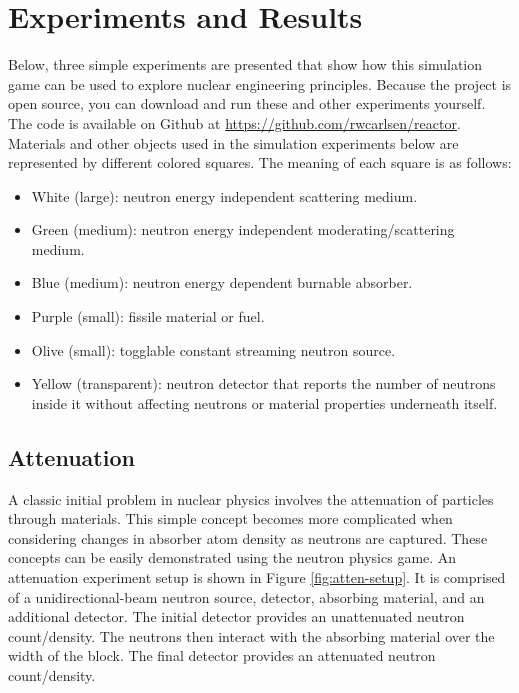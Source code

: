 \documentclass{anstrans}
\begin{document}
\section{Experiments and Results}

Below, three simple experiments are presented that show how this simulation
game can be used to explore nuclear engineering principles.  Because the
project is open source, you can download and run these and other
experiments yourself.  The code is available on Github at
\url{https://github.com/rwcarlsen/reactor}.  Materials and other objects used
in the simulation experiments below are represented by different colored
squares.  The meaning of each square is as follows:

\begin{itemize}
        
    \item White (large): neutron energy independent scattering medium.

    \item Green (medium): neutron energy independent moderating/scattering
        medium.

    \item Blue (medium): neutron energy dependent burnable absorber.

    \item Purple (small): fissile material or fuel.

    \item Olive (small): togglable constant streaming neutron source.

    \item Yellow (transparent): neutron detector that reports the number of
        neutrons inside it without affecting neutrons or material properties
        underneath itself.

\end{itemize}


\subsection{Attenuation}

A classic initial problem in nuclear physics involves the attenuation of
particles through materials. This simple concept becomes more complicated when
considering changes in absorber atom density as neutrons are captured. These
concepts can be easily demonstrated using the neutron physics game.  An
attenuation experiment setup is shown in Figure \ref{fig:atten-setup}. It is
comprised of a unidirectional-beam neutron source, detector, absorbing
material, and an additional detector. The initial detector provides an
unattenuated neutron count/density. The neutrons then interact with the
absorbing material over the width of the block. The final detector provides an
attenuated neutron count/density.
\end{document}
